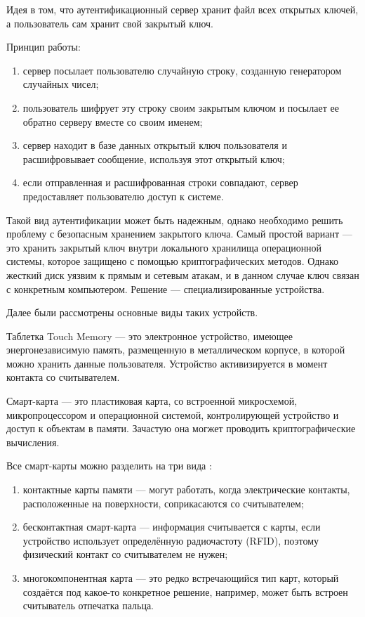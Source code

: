 Идея в том, что аутентификационный сервер хранит файл всех открытых ключей, а пользователь сам хранит свой закрытый ключ.

Принцип работы:
\begin{enumerate}
    \item сервер посылает пользователю случайную строку, созданную генератором случайных чисел;
    \item пользователь шифрует эту строку своим закрытым ключом и посылает ее обратно серверу вместе со своим именем;
    \item сервер находит в базе данных открытый ключ пользователя и расшифровывает сообщение, используя этот открытый ключ;
    \item если отправленная и расшифрованная строки совпадают, сервер предоставляет пользователю доступ к системе. 
\end{enumerate}

Такой вид аутентификации может быть надежным, однако необходимо решить проблему с безопасным хранением закрытого ключа. Самый простой вариант --- это хранить закрытый ключ внутри локального хранилища операционной системы, которое защищено с помощью криптографических методов. Однако жесткий диск уязвим к прямым и сетевым атакам, и в данном случае ключ связан с конкретным компьютером. Решение --- специализированные устройства. 

Далее были рассмотрены основные виды таких устройств.

Таблетка Touch Memory \cite{bib2} --- это электронное устройство, имеющее энергонезависимую память, размещенную в металлическом корпусе, в которой можно хранить данные пользователя. Устройство активизируется в момент контакта со считывателем.

Смарт-карта \cite{bib2} --- это пластиковая карта, со встроенной микросхемой, микропроцессором и операционной системой, контролирующей устройство и доступ к объектам в памяти. Зачастую она могжет проводить криптографические вычисления.

Все смарт-карты можно разделить на три вида \cite{bib8}:
\begin{enumerate}
    \item контактные карты памяти --- могут работать, когда электрические контакты, расположенные на поверхности, соприкасаются со считывателем;
    \item бесконтактная смарт-карта ---  информация считывается с карты, если \linebreak устройство использует определённую радиочастоту (RFID), поэтому физический контакт со считывателем не нужен;
    \item многокомпонентная карта --- это редко встречающийся тип карт, который создаётся под какое-то конкретное решение, например, может быть встроен считыватель отпечатка пальца.
\end{enumerate}


